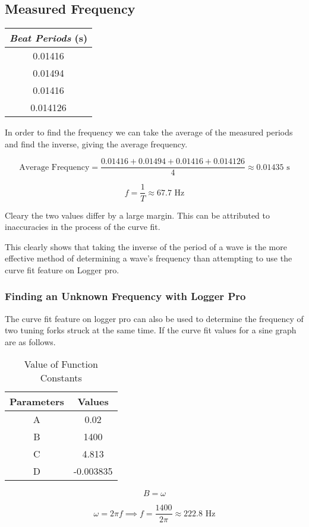 	\subsection{{Measured Frequency}}
	
		\begin{table}[H]
    \centering
    \begin{tabular}{|c|}
		\hline    		
    		\hline
        \textit{Beat Periods} (s) \\ 
        \hline
        0.01416 \\
        \hline
        0.01494 \\         
        \hline
        0.01416 \\ 
        \hline
        0.014126 \\ 
        \hline
        \hline
    \end{tabular}
\end{table}

		{In order to find the frequency we can take the average of the measured periods and find the inverse, giving the average frequency.}
		
			$$\text{Average Frequency} = \frac{0.01416 + 0.01494 + 0.01416 + 0.014126}{4}\approx 0.01435\text{ s}$$
			
			$$f = \frac{1}{T} \approx 67.7\text{ Hz}$$
			
		{Cleary the two values differ by a large margin. This can be attributed to inaccuracies in the process of the curve fit.}
		
		{This clearly shows that taking the inverse of the period of a wave is the more effective method of determining a wave's frequency than attempting to use the curve fit feature on Logger pro.}
		
		\subsubsection{{Finding an Unknown Frequency with Logger Pro}}
		
			{The curve fit feature on logger pro can also be used to determine the frequency of two tuning forks struck at the same time. If the curve fit values for a sine graph are as follows.}
			
			\begin{table}[H]
    \centering
    \begin{tabular}{|c|c|}
    \hline
        Parameters & Values \\ \hline
        A & 0.02 \\ \hline
        B & 1400 \\ \hline
        C & 4.813 \\ \hline
        D & -0.003835 \\ \hline
    \end{tabular}
    \caption{Value of Function Constants}
\end{table}

			$$B = \omega$$
			
			$$\omega = 2\pi f \implies f = \frac{1400}{2\pi} \approx 222.8\text{ Hz}$$